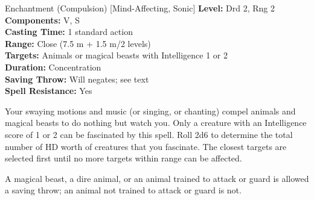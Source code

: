 {Enchantment (Compulsion) [Mind-Affecting, Sonic]}
{
	\textbf{Level:}
	Drd 2, Rng 2\\
	\textbf{Components:}
	V, S\\
	\textbf{Casting Time:}
	1 standard action\\
	\textbf{Range:}
	Close (7.5 m + 1.5 m/2 levels)\\
	\textbf{Targets:}
	Animals or magical beasts with Intelligence 1 or 2\\
	\textbf{Duration:}
	Concentration\\
	\textbf{Saving Throw:}
	Will negates; see text\\
	\textbf{Spell Resistance:}
	Yes\\
}
{
	Your swaying motions and music (or singing, or chanting) compel animals and magical beasts to do nothing but watch you. Only a creature with an Intelligence score of 1 or 2 can be fascinated by this spell. Roll 2d6 to determine the total number of HD worth of creatures that you fascinate. The closest targets are selected first until no more targets within range can be affected.

	A magical beast, a dire animal, or an animal trained to attack or guard is allowed a saving throw; an animal not trained to attack or guard is not.

}
